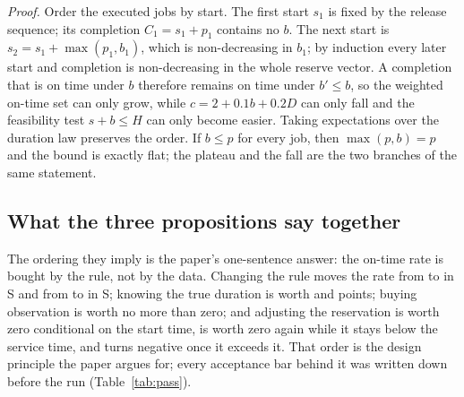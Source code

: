 \noindent\emph{Proof.} Order the executed jobs by start. The first start $s_1$ is fixed by the
release sequence; its completion $C_1=s_1+p_1$ contains no $b$. The next start is
$s_2=s_1+\max(p_1,b_1)$, which is non-decreasing in $b_1$; by induction every later start and
completion is non-decreasing in the whole reserve vector. A completion that is on time under $b$
therefore remains on time under $b'\le b$, so the weighted on-time set can only grow, while
$c=2+0.1b+0.2D$ can only fall and the feasibility test $s+b\le H$ can only become easier. Taking
expectations over the duration law preserves the order. If $b\le p$ for every job, then
$\max(p,b)=p$ and the bound is exactly flat; the plateau and the fall are the two branches of the
same statement.

\subsection*{What the three propositions say together}

The ordering they imply is the paper's one-sentence answer: the on-time rate is bought by the
rule, not by the data. Changing the rule moves the rate from \slotPImpSTwoAllBase{} to
\slotPImpSTwoAllCand{} in S\slotCaseTwo{} and from \slotPImpSThreeAllBase{} to
\slotPImpSThreeAllCand{} in S\slotCaseThree{}; knowing the true duration is worth
\slotPOracleGapSTwoPt{} and \slotPOracleGapSThreePt{} points; buying observation is worth no more
than zero; and adjusting the reservation is worth zero conditional on the start time, is worth
zero again while it stays below the service time, and turns negative once it exceeds it. That
order is the design principle the paper argues for; every acceptance bar behind it was written
down before the run (Table~\ref{tab:pass}).
